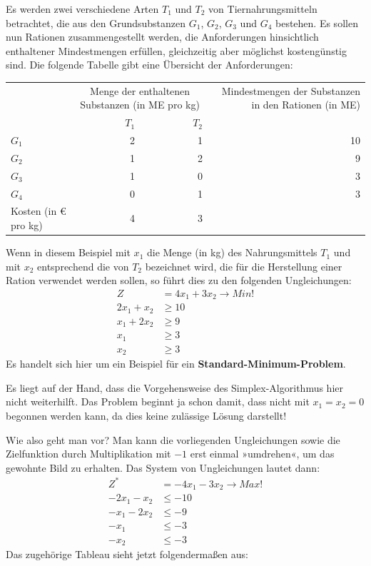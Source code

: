 Es werden zwei verschiedene Arten $T_1$ und $T_2$ von Tiernahrungsmitteln betrachtet, die aus den Grundsubstanzen $G_1$, $G_2$, $G_3$ und $G_4$ bestehen. Es sollen nun Rationen zusammengestellt werden, die Anforderungen hinsichtlich enthaltener Mindestmengen erfüllen, gleichzeitig aber möglichst kostengünstig sind. Die folgende Tabelle gibt eine Übersicht der Anforderungen:

\begin{center}
  \begin{tabular}{|l|r|r|r|}
    \hline
     & \multicolumn{2}{c|}{Menge der enthaltenen Substanzen (in ME pro kg)} & Mindestmengen der Substanzen in den Rationen (in ME)\\
     & $T_1$ & $T_2$ & \\
    \hline
    $G_1$ & 2 & 1 & 10\\
    $G_2$ & 1 & 2 & 9\\
    $G_3$ & 1 & 0 & 3\\
    $G_4$ & 0 & 1 & 3\\
    \hline
    Kosten (in \euro{} pro kg) & 4 & 3 & \\
    \hline
  \end{tabular}
\end{center}

Wenn in diesem Beispiel mit $x_1$ die Menge (in kg) des Nahrungsmittels $T_1$ und mit $x_2$ entsprechend die von $T_2$ bezeichnet wird, die für die Herstellung einer Ration verwendet werden sollen, so führt dies zu den folgenden Ungleichungen:
\begin{align*}
  Z &= 4x_1 + 3x_2 \rightarrow Min!\\
  2x_1 + x_2 &\geq 10\\
  x_1 + 2x_2 &\geq 9\\
  x_1 &\geq 3\\
  x_2 &\geq 3
\end{align*}
Es handelt sich hier um ein Beispiel für ein \textbf{Standard-Minimum-Problem}.

Es liegt auf der Hand, dass die Vorgehensweise des Simplex-Algorithmus hier nicht weiterhilft. Das Problem beginnt ja schon damit, dass nicht mit $x_1 = x_2 = 0$ begonnen werden kann, da dies keine zulässige Lösung darstellt!

Wie also geht man vor? Man kann die vorliegenden Ungleichungen sowie die Zielfunktion durch Multiplikation mit $-1$ erst einmal »umdrehen«, um das gewohnte Bild zu erhalten. Das System von Ungleichungen lautet dann:
\begin{align*}
  Z^* &= -4x_1 - 3x_2 \rightarrow Max!\\
  -2x_1 - x_2 &\leq -10\\
  -x_1 - 2x_2 &\leq -9\\
  -x_1 &\leq -3\\
  -x_2 &\leq -3
\end{align*}
Das zugehörige Tableau sieht jetzt folgendermaßen aus:

